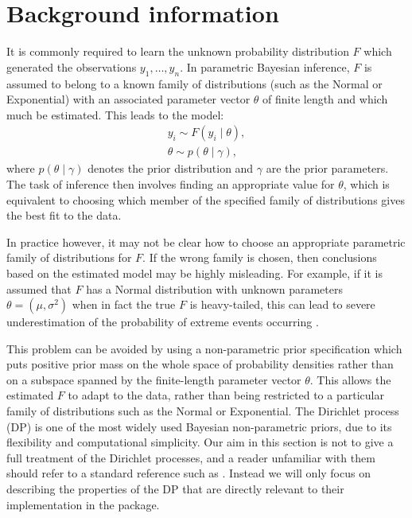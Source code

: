 \documentclass[nojss]{jss}
\begin{document}
\section{Background information}
\label{sec:background}


It is commonly required to learn the unknown probability distribution $F$ which generated the observations $y_1,\ldots,y_n$. In parametric Bayesian inference, $F$ is assumed to belong to a known family of distributions (such as the Normal or Exponential) with an associated parameter vector $\theta$ of finite length and which much be estimated. This leads to the model:
\begin{align*}
y_i \sim F(y_i \mid \theta), \\
\theta \sim p(\theta \mid \gamma),
\end{align*}
where $p(\theta \mid \gamma)$ denotes the prior distribution and $\gamma$ are the prior parameters. The task of inference then involves finding an appropriate value for $\theta$, which is equivalent to choosing which member of the specified family of distributions gives the best fit to the data.

In practice however, it may not be clear how to choose an appropriate parametric family of distributions for $F$. If the wrong family is chosen, then conclusions based on the estimated model may be highly misleading. For example, if it is assumed that $F$ has a Normal distribution with unknown parameters $\theta=(\mu,\sigma^2)$ when in fact the true $F$ is heavy-tailed, this can lead to severe underestimation of the probability of extreme events occurring \citep{coles_introduction_2001}.

This problem can be avoided by using a non-parametric prior specification which puts positive prior mass on the whole space of probability densities rather than on a subspace spanned by the finite-length parameter vector $\theta$. This allows the estimated $F$ to adapt to the data, rather than being restricted to a particular family of distributions such as the Normal or Exponential. The Dirichlet process (DP) is one of the most widely used Bayesian non-parametric priors, due to its flexibility and computational simplicity.  Our aim in this section is not to give a full treatment of the Dirichlet processes, and a reader unfamiliar with them should refer to a standard reference such as \cite{antoniak_mixtures_1974}. Instead we will only focus on describing the properties of the DP that are directly relevant to their implementation in the  package.
\end{document}
